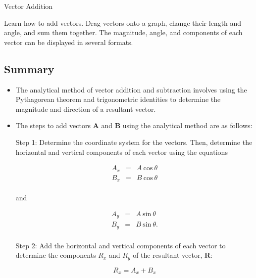 \documentclass[
]{book}
\begin{document}
\hypertarget{eip-948}{}
Vector Addition

Learn how to add vectors. Drag vectors onto a graph, change their length
and angle, and sum them together. The magnitude, angle, and components
of each vector can be displayed in several formats. {\hfill\break
}

\hypertarget{fs-id1167066847646}{}

\hypertarget{fs-id1628255-summary}{}
\hypertarget{summary-2}{%
\subsection{Summary}\label{summary-2}}

\begin{itemize}
\item
  \protect\hypertarget{import-auto-id1165296238488}{}{The analytical method of vector addition and subtraction involves
  using the Pythagorean theorem and trigonometric identities to
  determine the magnitude and direction of a resultant
  vector.}
\item
  \protect\hypertarget{import-auto-id1165296238492}{}{The steps to add vectors \(\mathbf{A}{}\) and \(\mathbf{B}{}\) using
  the analytical method are as follows:}

  Step 1: Determine the coordinate system for the vectors. Then,
  determine the horizontal and vertical components of each vector
  using the equations

  \leavevmode{}%
  \[\begin{array}{lll}
  A_{x} & = & {A\ \text{cos}\ \theta} \\
  B_{x} & = & {B\ \text{cos}\ \theta} \\
  \end{array}{}\]

  and

  \leavevmode{}%
  \[\begin{array}{lll}
  A_{y} & = & {A\ \text{sin}\ \theta} \\
  B_{y} & = & {B\ \text{sin}\ \theta\text{.}} \\
  \end{array}{}\]

  Step 2: Add the horizontal and vertical components of each vector to
  determine the components \(R_{x}{}\) and \(R_{y}{}\) of the resultant
  vector, \(\textbf{R}{}\):

  \leavevmode{}%
  \[{R_{x} = {A_{x} + B_{x}}}{}\]


\end{itemize}
\end{document}
